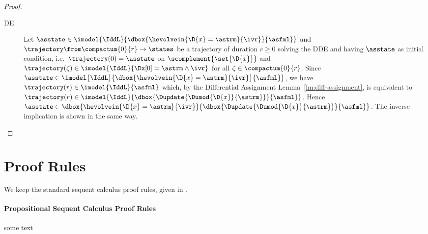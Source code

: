 \begin{proof}
\begin{description}
        \item[DE] Let $\asstate\in\imodel{\IddL}{\dbox{\hevolvein{\D{x}=\astrm}{\ivr}}{\asfml}}$ and $\trajectory\from\compactum{0}{r}\to\states$ be a trajectory of duration $r\geq 0$ solving the DDE and having $\asstate$ as initial condition, i.e.\ $\trajectory(0)=\asstate$ on $\scomplement{\set{\D{x}}}$ and $\trajectory(\zeta)\in\imodel{\IddL}{\Dx[0]=\astrm\land\ivr}$ for all $\zeta\in\compactum{0}{r}$.
        Since $\asstate\in\imodel{\IddL}{\dbox{\hevolvein{\D{x}=\astrm}{\ivr}}{\asfml}}$, we have $\trajectory(r)\in\imodel{\IddL}{\asfml}$ which, by the Differential Assignment Lemma~\ref{lm:diff-assignment}, is equivalent to $\trajectory(r)\in\imodel{\IddL}{\dbox{\Dupdate{\Dumod{\D{x}}{\astrm}}}{\asfml}}$. Hence $\asstate\in\dbox{\hevolvein{\D{x}=\astrm}{\ivr}}{\dbox{\Dupdate{\Dumod{\D{x}}{\astrm}}}{\asfml}}$.
        The inverse implication is shown in the same way.
    \end{description}
    \end{proof}

\section{Proof Rules}
    \label{sec:proof-rules}

    We keep the standard sequent calculus proof rules, given in \dL.

    \paragraph{Propositional Sequent Calculus Proof Rules}
        \label{sec:propositional-rules}

        some text

        \begin{calculus}

        \end{calculus}


